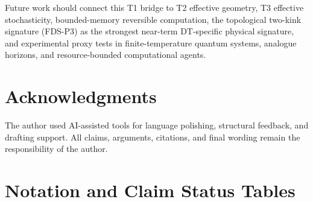 \documentclass[10pt,a4paper,twocolumn,aps,prl]{revtex4-2}
\begin{document}
Future work should connect this T1 bridge to T2 effective geometry, T3 effective stochasticity, bounded-memory reversible computation, the topological two-kink signature (FDS-P3) as the strongest near-term DT-specific physical signature, and experimental proxy tests in finite-temperature quantum systems, analogue horizons, and resource-bounded computational agents.

\section*{Acknowledgments}

The author used AI-assisted tools for language polishing, structural feedback, and drafting support. All claims, arguments, citations, and final wording remain the responsibility of the author.

\appendix

\section{Notation and Claim Status Tables}
\end{document}

